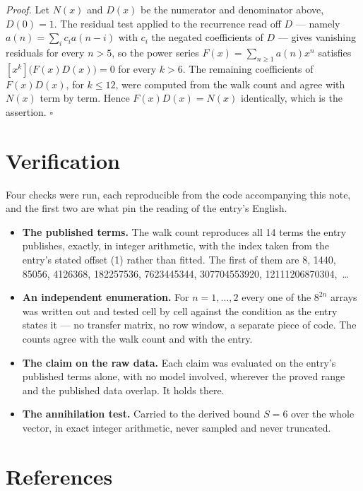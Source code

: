 \documentclass[11pt]{article}
\theoremstyle{definition}
\begin{document}
{\itshape Proof.} Let $N(x)$ and $D(x)$ be the numerator and denominator above, $D(0)=1$. The residual test applied to the recurrence read off $D$ --- namely $a(n) = \sum_i c_i a(n-i)$ with $c_i$ the negated coefficients of $D$ --- gives vanishing residuals for every $n > 5$, so the power series $F(x)=\sum_{n\ge 1}a(n)x^n$ satisfies $[x^k]\bigl(F(x)D(x)\bigr) = 0$ for every $k > 6$. The remaining coefficients of $F(x)D(x)$, for $k \le 12$, were computed from the walk count and agree with $N(x)$ term by term. Hence $F(x)D(x) = N(x)$ identically, which is the assertion. $\square$

\section{Verification}

Four checks were run, each reproducible from the code accompanying this note, and the first two are what pin the reading of the entry's English.

\begin{itemize}

\item {\bfseries The published terms.} The walk count reproduces all 14 terms the entry publishes, exactly, in integer arithmetic, with the index taken from the entry's stated offset (1) rather than fitted. The first of them are 8, 1440, 85056, 4126368, 182257536, 7623445344, 307704553920, 12111206870304,~\dots

\item {\bfseries An independent enumeration.} For $n = 1,\dots,2$ every one of the $8^{2n}$ arrays was written out and tested cell by cell against the condition as the entry states it --- no transfer matrix, no row window, a separate piece of code. The counts agree with the walk count and with the entry.

\item {\bfseries The claim on the raw data.} Each claim was evaluated on the entry's published terms alone, with no model involved, wherever the proved range and the published data overlap. It holds there.

\item {\bfseries The annihilation test.} Carried to the derived bound $S = 6$ over the whole vector, in exact integer arithmetic, never sampled and never truncated.

\end{itemize}

\section{References}
\end{document}
